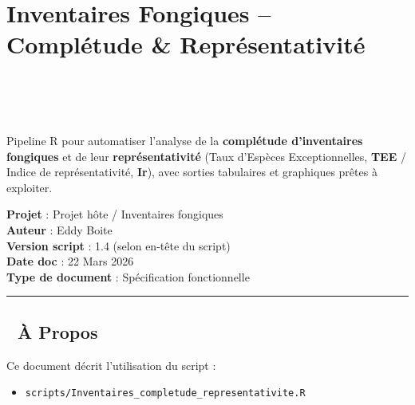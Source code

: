 \section{Inventaires Fongiques -- Complétude \&
Représentativité}\label{inventaires-fongiques-compluxe9tude-repruxe9sentativituxe9}

\href{https://www.r-project.org/}{\pandocbounded{}}\\
\href{../scripts/Inventaires_completude_representativite.R}{\pandocbounded{}}\\
\href{../README.md}{\pandocbounded{}}\\
\hyperref[-quick-start]{\pandocbounded{}}

Pipeline R pour automatiser l'analyse de la \textbf{complétude
d'inventaires fongiques} et de leur \textbf{représentativité} (Taux
d'Espèces Exceptionnelles, \textbf{TEE} / Indice de représentativité,
\textbf{Ir}), avec sorties tabulaires et graphiques prêtes à exploiter.

\textbf{Projet} : Projet hôte / Inventaires fongiques\\
\textbf{Auteur} : Eddy Boite\\
\textbf{Version script} : 1.4 (selon en-tête du script)\\
\textbf{Date doc} : 22 Mars 2026\\
\textbf{Type de document} : Spécification fonctionnelle

\begin{center}\rule{0.5\linewidth}{0.5pt}\end{center}

\subsection{📖 À Propos}\label{uxe0-propos}

Ce document décrit l'utilisation du script :

\begin{itemize}
\tightlist
\item
  \texttt{scripts/Inventaires\_completude\_representativite.R}
\end{itemize}

